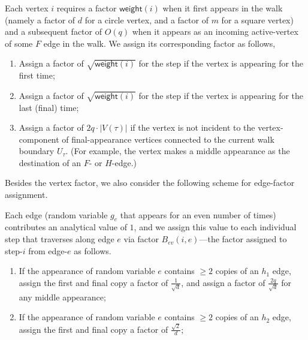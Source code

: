 \documentclass[12pt]{article}
\newcommand{\wt}[1]{\widetilde{#1}}
\renewcommand{\wt}{\mathsf{weight}}
\begin{document}
\begin{mdframed}[frametitle = Combinatorial Factor Assignment for Vertex Factors] \label{prop:vtx-assignment}
 Each vertex $i$ requires a factor $\wt{(i)}$ when it first appears in the walk (namely a factor of $d$ for a circle vertex, and a factor of $m$ for a square vertex) and a subsequent factor of $O(q)$ when it appears as an incoming active-vertex of some $F$ edge in the walk. We assign its corresponding factor  as follows,
\begin{enumerate}
	\item Assign a factor of $\sqrt{\wt(i) } $ for the step if the vertex is appearing for the first time;
	\item Assign a factor of $\sqrt{\wt(i)}$ for the step if the vertex is appearing for the last (final) time;
	\item Assign a factor of $2q \cdot |V(\tau)|$ if the vertex is not incident to the vertex-component of final-appearance vertices connected to the current walk boundary $U_\tau$. (For example, the vertex makes a middle appearance as the destination of an $F$- or $H$-edge.) 
\end{enumerate}
\end{mdframed}


 
Besides the vertex factor, we also consider the following scheme for edge-factor assignment.
\begin{mdframed}[frametitle = Analytical Factor Assignment for Edges] \label{prop: edge-value-assignment}
Each edge (random variable $g_e$ that appears for an even number of times) contributes an analytical value of $1$, and we assign this value to each individual step that traverses along edge $e$ via factor $B_{ev}(i,e)$---the factor assigned to step-$i$ from edge-$e$ as follows.
\begin{enumerate}
	\item If the appearance of random variable $e$ contains $\geq 2$ copies of an $h_1$ edge, assign the first and final copy a factor of $\frac{1}{\sqrt{d}}$, and assign a factor of $\frac{2q}{\sqrt{d}}$ for any middle appearance;
	\item  If the appearance of random variable $e$ contains $\geq 2$ copies of an $h_2$ edge, assign the first and final copy a factor of $\frac{\sqrt{2}}{d} $;
\end{enumerate}	
\end{mdframed}
\end{document}
